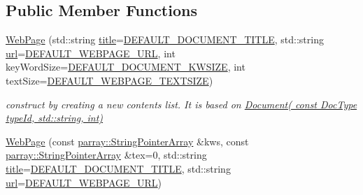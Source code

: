 \subsection*{Public Member Functions}
\begin{DoxyCompactItemize}
\item 
\hypertarget{classdocs_1_1WebPage_a9642db10cbcecf7fd93338f936318e90}{\hyperlink{classdocs_1_1WebPage_a9642db10cbcecf7fd93338f936318e90}{Web\-Page} (std\-::string \hyperlink{classdocs_1_1Document_a419e4470c20e1bddd60448ba430f4738}{title}=\hyperlink{namespacedocs_a4cf6dd6732c7e7ab7f7855e440485d89}{D\-E\-F\-A\-U\-L\-T\-\_\-\-D\-O\-C\-U\-M\-E\-N\-T\-\_\-\-T\-I\-T\-L\-E}, std\-::string \hyperlink{classdocs_1_1WebPage_a4495e463a26d77b22ec4d8af690bbb11}{url}=\hyperlink{namespacedocs_a9bfb062436ca30729256c522cf54c111}{D\-E\-F\-A\-U\-L\-T\-\_\-\-W\-E\-B\-P\-A\-G\-E\-\_\-\-U\-R\-L}, int key\-Word\-Size=\hyperlink{namespacedocs_ae635b9481a61628036b5a97625856475}{D\-E\-F\-A\-U\-L\-T\-\_\-\-D\-O\-C\-U\-M\-E\-N\-T\-\_\-\-K\-W\-S\-I\-Z\-E}, int text\-Size=\hyperlink{namespacedocs_a966b8c0a825e3e04a2c667abefa97f41}{D\-E\-F\-A\-U\-L\-T\-\_\-\-W\-E\-B\-P\-A\-G\-E\-\_\-\-T\-E\-X\-T\-S\-I\-Z\-E})}\label{classdocs_1_1WebPage_a9642db10cbcecf7fd93338f936318e90}

\begin{DoxyCompactList}\small\item\em construct by creating a new contents list. It is based on \hyperlink{classdocs_1_1Document_a9f0b2c4c1a3e3344f374330399969e90}{Document( const Doc\-Type type\-Id, std\-::string, int)} \end{DoxyCompactList}\item 
\hypertarget{classdocs_1_1WebPage_a7013883a569946e65ba6522c878b0517}{\hyperlink{classdocs_1_1WebPage_a7013883a569946e65ba6522c878b0517}{Web\-Page} (const \hyperlink{classparray_1_1StringPointerArray}{parray\-::\-String\-Pointer\-Array} \&kws, const \hyperlink{classparray_1_1StringPointerArray}{parray\-::\-String\-Pointer\-Array} \&tex=0, std\-::string \hyperlink{classdocs_1_1Document_a419e4470c20e1bddd60448ba430f4738}{title}=\hyperlink{namespacedocs_a4cf6dd6732c7e7ab7f7855e440485d89}{D\-E\-F\-A\-U\-L\-T\-\_\-\-D\-O\-C\-U\-M\-E\-N\-T\-\_\-\-T\-I\-T\-L\-E}, std\-::string \hyperlink{classdocs_1_1WebPage_a4495e463a26d77b22ec4d8af690bbb11}{url}=\hyperlink{namespacedocs_a9bfb062436ca30729256c522cf54c111}{D\-E\-F\-A\-U\-L\-T\-\_\-\-W\-E\-B\-P\-A\-G\-E\-\_\-\-U\-R\-L})}\label{classdocs_1_1WebPage_a7013883a569946e65ba6522c878b0517}


\end{DoxyCompactItemize}
